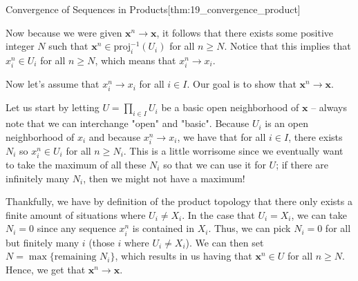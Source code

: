 \begin{thmBox}{Convergence of Sequences in Products}[thm:19_convergence_product]
\begin{proofBox}
        \baseSkip 

        Now because we were given \( \mathbf{x}^{ n } \rightarrow \mathbf{x} \),
        it follows that there exists some positive integer \( N \) such that 
        \( \mathbf{x}^{ n } \in \mathrm{proj}_{ i }^{ -1 } ( U_{ i } ) \) for 
        all \( n \geq N \).
        Notice that this implies that \( x_{ i }^{ n } \in U_{ i } \) for all 
        \( n \geq N \), which means that \( x_{ i }^{ n } \rightarrow 
        x_{ i } \).

        \baseSkip

        \wrapBox{\( \impliedby \)}
        Now let's assume that \( x_{ i }^{ n } \rightarrow x_{ i } \) for all 
        \( i \in I \).
        Our goal is to show that \( \mathbf{x}^{ n } \rightarrow \mathbf{x} \).

        \baseSkip

        Let us start by letting \( U = \prod_{ i \in I } U_{ i } \) be a 
        basic open neighborhood of \( \mathbf{x} \) -- always note that we 
        can interchange "open" and "basic".
        Because \( U_{ i } \) is an open neighborhood of \( x_{ i } \) and 
        because \( x_{ i }^{ n } \rightarrow x_{ i } \), we have that for all
        \( i \in I \), there exists \( N_{ i } \) so \( x_{ i }^{ n } \in 
        U_{ i } \) for all \( n \geq N_{ i } \).
        This is a little worrisome since we eventually want to take the maximum
        of all these \( N_{ i } \) so that we can use it for \( U \); if there 
        are infinitely many \( N_{ i } \), then we might not have a maximum!

        \baseSkip

        Thankfully, we have by definition of the product topology that 
        there only exists a finite amount of situations where \( U_{ i } \neq 
        X_{ i } \).
        In the case that \( U_{ i } = X_{ i } \), we can take \( N_{ i } = 0 \)
        since any sequence \( x_{ i }^{ n } \) is contained in \( X_{ i } \).
        Thus, we can pick \( N_{ i } = 0 \) 
        for all but finitely many \( i \) (those \( i \) where \( U_{ i } \neq
        X_{ i } \)).
        We can then set \( N = \max \{ \text{remaining } N_{ i } \} \), which
        results in us having that \( \mathbf{x}^{ n } \in U \) for all
        \( n \geq N \).
        Hence, we get that \( \mathbf{x}^{ n } \rightarrow \mathbf{x} \).
    \end{proofBox}
\end{thmBox}